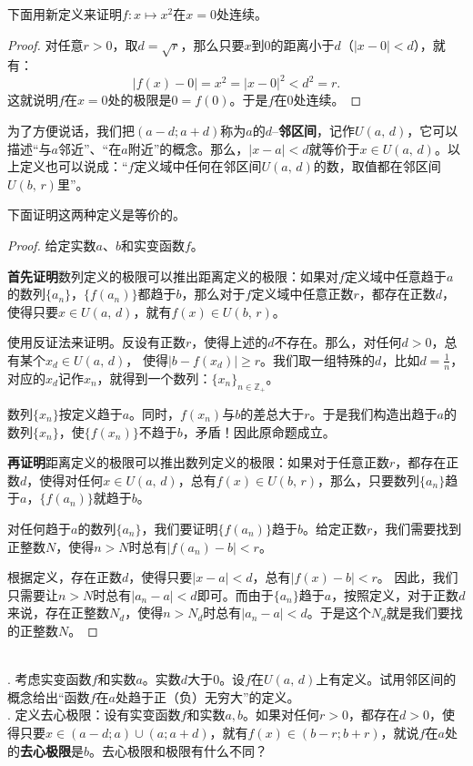 \documentclass[12pt,UTF8,fontset=none]{ctexbook}
\begin{document}
下面用新定义来证明$f:x\mapsto x^2$在$x=0$处连续。
\begin{proof}
    对任意$r>0$，取$d = \sqrt{r}$，那么只要$x$到$0$的距离小于$d$（$|x - 0| < d$），就有：
    $$|f(x) - 0| = x^2  = |x - 0|^2 < d^2 = r.$$
    这就说明$f$在$x=0$处的极限是$0 = f(0)$。于是$f$在$0$处连续。
\end{proof}

为了方便说话，我们把$(a-d;a+d)$称为$a$的$d$–\textbf{邻区间}，记作$U(a,\,d)$，它可以描述“与$a$邻近”、“在$a$附近”的概念。那么，$|x - a| < d$就等价于$x\in U(a,\,d)$。以上定义也可以说成：“$f$定义域中任何在邻区间$U(a,\,d)$的数，取值都在邻区间$U(b,\,r)$里”。

下面证明这两种定义是等价的。
\begin{proof}
    给定实数$a$、$b$和实变函数$f$。

    \textbf{首先证明}数列定义的极限可以推出距离定义的极限：如果对$f$定义域中任意趋于$a$的数列$\{a_n\}$，$\{f(a_n)\}$都趋于$b$，那么对于$f$定义域中任意正数$r$，都存在正数$d$，使得只要$x\in U(a,\,d)$，就有$f(x)\in U(b,\,r)$。

    使用反证法来证明。反设有正数$r$，使得上述的$d$不存在。那么，对任何$d>0$，总有某个$x_d\in U(a,\,d)$，
    使得$ |b - f(x_d)| \geqslant r$。我们取一组特殊的$d$，比如$d = \frac{1}{n}$，对应的$x_d$记作$x_n$，就得到一个数列：$\{x_n\}_{n\in\mathbb{Z}_+}$。
    
    数列$\{x_n\}$按定义趋于$a$。同时，$f(x_n)$与$b$的差总大于$r$。于是我们构造出趋于$a$的数列$\{x_n\}$，使$\{f(x_n)\}$不趋于$b$，矛盾！因此原命题成立。

    \textbf{再证明}距离定义的极限可以推出数列定义的极限：如果对于任意正数$r$，都存在正数$d$，使得对任何$x\in U(a,\,d)$，总有$f(x)\in U(b,\,r)$，那么，只要数列$\{a_n\}$趋于$a$，$\{f(a_n)\}$就趋于$b$。

    对任何趋于$a$的数列$\{a_n\}$，我们要证明$\{f(a_n)\}$趋于$b$。给定正数$r$，我们需要找到正整数$N$，使得$n>N$时总有$|f(a_n) - b| < r$。
    
    根据定义，存在正数$d$，使得只要$|x - a| < d$，总有$|f(x) - b| < r$。
    因此，我们只需要让$n>N$时总有$|a_n - a| < d$即可。而由于$\{a_n\}$趋于$a$，按照定义，对于正数$d$来说，存在正整数$N_d$，使得$n>N_d$时总有$|a_n - a| < d$。于是这个$N_d$就是我们要找的正整数$N$。

\end{proof}

\begin{sk}
    \mbox{} \\
    . 考虑实变函数$f$和实数$a$。实数$d$大于$0$。设$f$在$U(a,\,d)$上有定义。试用邻区间的概念给出“函数$f$在$a$处趋于正（负）无穷大”的定义。\\
    . 定义去心极限：设有实变函数$f$和实数$a, b$。如果对任何$r>0$，都存在$d>0$，使得只要$x\in(a-d;a)\cup(a;a+d)$，就有$f(x)\in(b-r;b+r)$，就说$f$在$a$处的\textbf{去心极限}是$b$。去心极限和极限有什么不同？
\end{sk}
\end{document}
